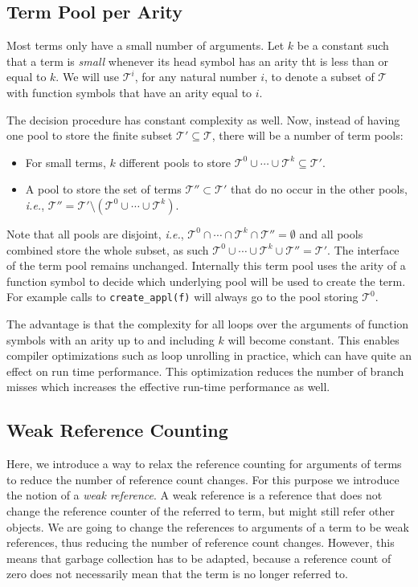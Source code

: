 \documentclass[10pt,a4paper]{article}
\theoremstyle{definition}
\newcommand{\terms}{\mathcal{T}}
\newcommand{\ie}{\emph{i.e.}}
\begin{document}
\subsection{Term Pool per Arity}

Most terms only have a small number of arguments. 
Let $k$ be a constant such that a term is \emph{small} whenever its head symbol has an arity tht is less than or equal to $k$. 
We will use $\terms^i$, for any natural number $i$, to denote a subset of $\terms$ with function symbols that have an arity equal to $i$. 

The decision procedure has constant complexity as well.
Now, instead of having one pool to store the finite subset $\terms' \subseteq \terms$, there will be a number of term pools:

\begin{itemize}
  \item For small terms, $k$ different pools to store $\terms^0 \cup \cdots \cup \terms^k \subseteq \terms'$.
    
  \item A pool to store the set of terms $\terms'' \subset \terms'$ that do no occur in the other pools, \ie, $\terms'' = \terms' \setminus (\terms^0 \cup \cdots \cup \terms^k)$.
\end{itemize}

\noindent Note that all pools are disjoint, \ie, $\terms^0 \cap \cdots \cap \terms^k \cap \terms'' = \emptyset$ and all pools combined store the whole subset, as such $\terms^0 \cup \cdots \cup \terms^k \cup \terms'' = \terms'$. 
The interface of the term pool remains unchanged. 
Internally this term pool uses the arity of a function symbol to decide which underlying pool will be used to create the term. 
For example calls to \texttt{create\_appl(f)} will always go to the pool storing $\terms^0$.

The advantage is that the complexity for all loops over the arguments of function symbols with an arity up to and including $k$ will become constant. 
This enables compiler optimizations such as loop unrolling in practice, which can have quite an effect on run time performance. 
This optimization reduces the number of branch misses which increases the effective run-time performance as well.

\subsection{Weak Reference Counting}

Here, we introduce a way to relax the reference counting for arguments of terms to reduce the number of reference count changes.
For this purpose we introduce the notion of a \emph{weak reference}.
A weak reference is a reference that does not change the reference counter of the referred to term, but might still refer other objects.
We are going to change the references to arguments of a term to be weak references, thus reducing the number of reference count changes.
However, this means that garbage collection has to be adapted, because a reference count of zero does not necessarily mean that the term is no longer referred to.
\end{document}
